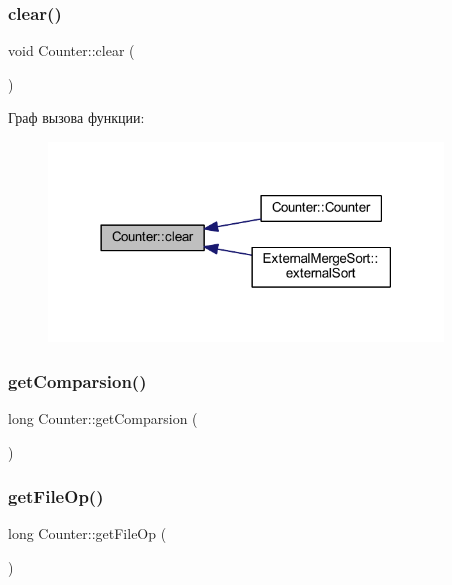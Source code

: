 \subsubsection{\texorpdfstring{clear()}{clear()}}
{\footnotesize\ttfamily void Counter\+::clear (\begin{DoxyParamCaption}{ }\end{DoxyParamCaption})}

Граф вызова функции\+:\nopagebreak
\begin{figure}[H]
\begin{center}
\leavevmode
\includegraphics[width=297pt]{class_counter_af66c74ac2bc69fa4f30c34377f869596_icgraph}
\end{center}
\end{figure}
\hypertarget{class_counter_a273aaa4592ef5fae6b7a90544d0ff6e0}{}\label{class_counter_a273aaa4592ef5fae6b7a90544d0ff6e0} 
\subsubsection{\texorpdfstring{get\+Comparsion()}{getComparsion()}}
{\footnotesize\ttfamily long Counter\+::get\+Comparsion (\begin{DoxyParamCaption}{ }\end{DoxyParamCaption})}

\hypertarget{class_counter_ac0a53b0296d0eacca2a2391a12ae39c5}{}\label{class_counter_ac0a53b0296d0eacca2a2391a12ae39c5} 
\subsubsection{\texorpdfstring{get\+File\+Op()}{getFileOp()}}
{\footnotesize\ttfamily long Counter\+::get\+File\+Op (\begin{DoxyParamCaption}{ }\end{DoxyParamCaption})}

